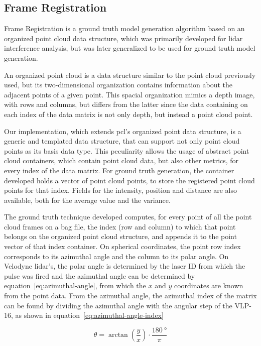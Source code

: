 \subsection{Frame Registration}
\label{subsec:lidar-interference:frame-registration}
Frame Registration is a ground truth model generation algorithm based on an organized point cloud data structure, which was primarily developed for \ac{lidar} interference analysis, but was later generalized to be used for ground truth model generation.

An organized point cloud is a data structure similar to the point cloud previously used, but its two-dimensional organization contains information about the adjacent points of a given point. This spacial organization mimics a depth image, with rows and columns, but differs from the latter since the data containing on each index of the data matrix is not only depth, but instead a point cloud point.

Our implementation, which extends \ac{pcl}'s organized point data structure, is a generic and templated data structure, that can support not only point cloud points as its basis data type. This peculiarity allows the usage of abstract point cloud containers, which contain point cloud data, but also other metrics, for every index of the data matrix. For ground truth generation, the container developed holds a vector of point cloud points, to store the registered point cloud points for that index. Fields for the intensity, position and distance are also available, both for the average value and the variance.

The ground truth technique developed computes, for every point of all the point cloud frames on a bag file, the index (row and column) to which that point belongs on the organized point cloud structure, and appends it to the point vector of that index container. On spherical coordinates, the point row index corresponds to its azimuthal angle and the column to its polar angle. On Velodyne \ac{lidar}'s, the polar angle is determined by the laser ID from which the pulse was fired and the azimuthal angle can be determined by equation~\ref{eq:azimuthal-angle}, from which the $x$ and $y$ coordinates are known from the point data. From the azimuthal angle, the azimuthal index of the matrix can be found by dividing the azimuthal angle with the angular step of the VLP-16, as shown in equation~\ref{eq:azimuthal-angle-index}

\begin{equation}
	\label{eq:azimuthal-angle}
	\theta = \arctan\left(\frac{y}{x}\right) \cdot \frac{\SI{180}{\degree}}{\pi}
\end{equation}

